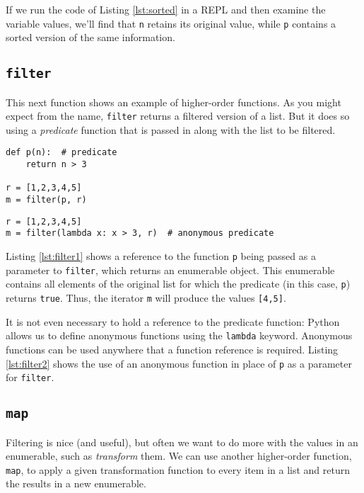 \documentclass[ignorenonframetext,red]{beamer}
\begin{document}
\noindent If we run the code of Listing \ref{lst:sorted} in a REPL and then examine the variable values, we'll find that \texttt{n} retains its original value, while \texttt{p} contains a sorted version of the same information.

\subsection{\tt filter}
This next function shows an example of higher-order functions. As you might expect from the name, \texttt{filter} returns a filtered version of a list. But it does so using a \textit{predicate} function that is passed in along with the list to be filtered.

\begin{frame}[fragile]
\begin{lstlisting}[style=python,caption={Filtering a List},label={lst:filter1}]
def p(n):  # predicate
    return n > 3

r = [1,2,3,4,5]
m = filter(p, r)
\end{lstlisting}

\begin{lstlisting}[style=python,caption={Anonymous Functions},label={lst:filter2}]
r = [1,2,3,4,5]
m = filter(lambda x: x > 3, r)  # anonymous predicate
\end{lstlisting}
\end{frame}

Listing \ref{lst:filter1} shows a reference to the function \texttt{p} being passed as a parameter to \texttt{filter}, which returns an enumerable object. This enumerable contains all elements of the original list for which the predicate (in this case, \texttt{p}) returns \texttt{true}. Thus, the iterator \texttt{m} will produce the values \texttt{[4,5]}.

It is not even necessary to hold a reference to the predicate function: Python allows us to define anonymous functions using the \texttt{lambda} keyword. Anonymous functions can be used anywhere that a function reference is required. Listing \ref{lst:filter2} shows the use of an anonymous function in place of \texttt{p} as a parameter for \texttt{filter}.

\subsection{\tt map}
Filtering is nice (and useful), but often we want to do more with the values in an enumerable, such as \textit{transform} them. We can use another higher-order function, \texttt{map}, to apply a given transformation function to every item in a list and return the results in a new enumerable.
\end{document}
